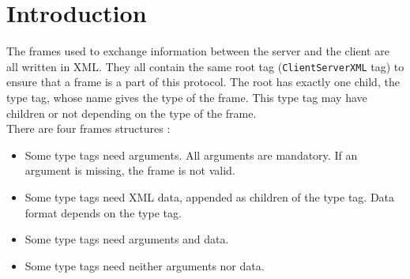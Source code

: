 \chapter{Introduction}

The frames used to exchange information between the server and the client are
all written in XML. They all contain the same root tag
(\texttt{ClientServerXML} tag) to ensure that a frame is a part of this
protocol. The root has exactly one child, the type tag, whose name gives the
type of the frame. This type tag may have children or not depending on the type
of the frame.\\

There are four frames structures : 

\begin{itemize}
 \item Some type tags need arguments. All arguments are mandatory. If
an argument is missing, the frame is not valid.
 \item Some type tags need XML data, appended as children of the type tag. Data
format depends on the type tag.
 \item Some type tags need arguments and data.
 \item Some type tags need neither arguments nor data.
\end{itemize}

